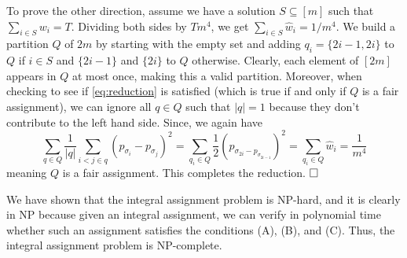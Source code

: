 \documentclass[11pt]{article}
\def\squarebox#1{\hbox to #1{\hfill\vbox to #1{\vfill}}}
\newcommand{\qed}{\hspace*{\fill}\vbox{\hrule\hbox{\vrule\squarebox{.667em}\vrule}\hrule}\smallskip}
\newenvironment{proof}{\noindent{\bf Proof:~~}}{\(\qed\)}
\begin{document}
\begin{proof}
  To prove the other direction, assume we have a solution $S \subseteq [m]$ such
  that $\sum_{i \in S} w_i = T$. Dividing both sides by $T m^4$, we get
  $\sum_{i \in S} \hat w_i = 1/m^4$. We build a partition $Q$ of $2m$ by
  starting with the empty set and adding $q_i = \{2i-1, 2i\}$ to $Q$ if $i \in
  S$ and $\{2i-1\}$ and $\{2i\}$ to $Q$ otherwise. Clearly, each element of
  $[2m]$ appears in $Q$ at most once, making this a valid partition. Moreover,
  when checking to see if \eqref{eq:reduction} is satisfied (which is true if
  and only if $Q$ is a fair assignment), we can ignore all $q \in Q$ such that
  $|q| = 1$ because they don't contribute to the left hand side. Since, we again
  have
  \begin{equation*}
    \sum_{q \in Q} \frac{1}{|q|} \sum_{i < j \in q} (p_{\sigma_i} -
    p_{\sigma_j})^2 = \sum_{q_i \in Q} \frac{1}{2} (p_{\sigma_{2i} -
    p_{\sigma_{2i-1}}})^2 =  \sum_{q_i \in Q} \hat w_i = \frac{1}{m^4}
  \end{equation*}
  meaning $Q$ is a fair assignment. This completes the reduction.
\end{proof}

We have shown that the integral assignment problem is NP-hard, and it is clearly
in NP because given an integral assignment, we can verify in polynomial time
whether such an assignment satisfies the conditions (A), (B), and (C). Thus, the
integral assignment problem is NP-complete.
\end{document}
